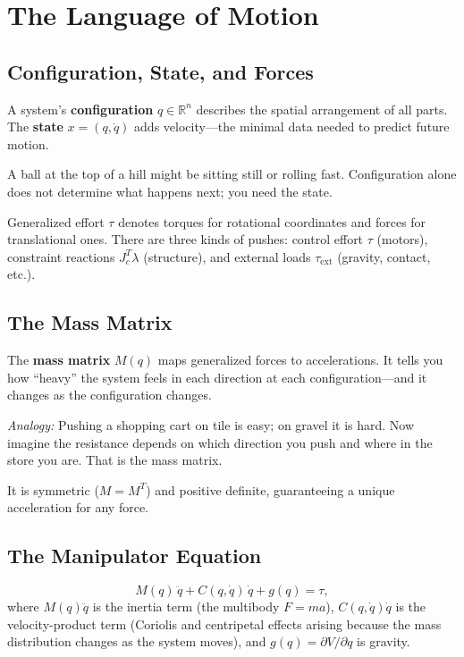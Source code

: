 \documentclass[11pt]{article}
\begin{document}
\section{The Language of Motion}\label{sec:core-concepts}

\subsection{Configuration, State, and Forces}

A system's \textbf{configuration} $q \in \mathbb{R}^n$ describes the spatial arrangement of all parts. The \textbf{state} $x = (q, \dot{q})$ adds velocity---the minimal data needed to predict future motion.

A ball at the top of a hill might be sitting still or rolling fast. Configuration alone does not determine what happens next; you need the state.

Generalized effort $\tau$ denotes torques for rotational coordinates and forces for translational ones. There are three kinds of pushes: control effort $\tau$ (motors), constraint reactions $J_c^T\lambda$ (structure), and external loads $\tau_{\mathrm{ext}}$ (gravity, contact, etc.).

\subsection{The Mass Matrix}

The \textbf{mass matrix} $M(q)$ maps generalized forces to accelerations. It tells you how ``heavy'' the system feels in each direction at each configuration---and it changes as the configuration changes.

\textit{Analogy:} Pushing a shopping cart on tile is easy; on gravel it is hard. Now imagine the resistance depends on which direction you push and where in the store you are. That is the mass matrix.

It is symmetric ($M = M^T$) and positive definite, guaranteeing a unique acceleration for any force.

\subsection{The Manipulator Equation}

\begin{equation}\label{eq:manipulator}
M(q)\,\ddot{q} + C(q,\dot{q})\,\dot{q} + g(q) = \tau,
\end{equation}
where $M(q)\ddot{q}$ is the inertia term (the multibody $F=ma$), $C(q,\dot{q})\dot{q}$ is the velocity-product term (Coriolis and centripetal effects arising because the mass distribution changes as the system moves), and $g(q) = \partial V/\partial q$ is gravity.
\end{document}
